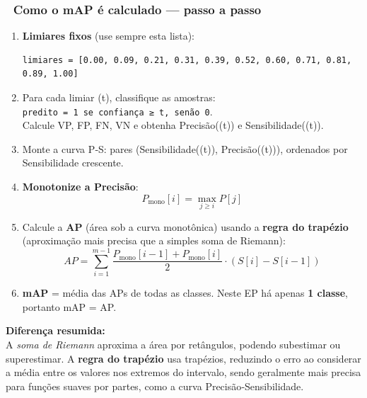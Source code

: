 \documentclass[
  portuguese,
  letterpaper,
  openany,
  oneside,
  12pt,
  a4paper]{book}
\begin{document}
\subsubsection{🔢 Como o mAP é calculado --- passo a
passo}\label{como-o-map-uxe9-calculado-passo-a-passo}

\begin{enumerate}
\def\labelenumi{\arabic{enumi}.}
\item
  \textbf{Limiares fixos} (use sempre esta lista):

\begin{verbatim}
limiares = [0.00, 0.09, 0.21, 0.31, 0.39, 0.52, 0.60, 0.71, 0.81, 0.89, 1.00]
\end{verbatim}
\item
  Para cada limiar (t), classifique as amostras:
  \texttt{predito\ =\ 1\ se\ confiança\ ≥\ t,\ senão\ 0}.\\
  Calcule VP, FP, FN, VN e obtenha Precisão((t)) e Sensibilidade((t)).
\item
  Monte a curva P‑S: pares (Sensibilidade((t)), Precisão((t))),
  ordenados por Sensibilidade crescente.
\item
  \textbf{Monotonize a Precisão}:\\
  \[P_{\text{mono}}[i] = \max_{j \ge i} P[j]\]
\item
  Calcule a \textbf{AP} (área sob a curva monotônica) usando a
  \textbf{regra do trapézio} (aproximação mais precisa que a simples
  soma de Riemann):\\
  \[AP = \sum_{i=1}^{m-1} \frac{P_{\text{mono}}[i-1] + P_{\text{mono}}[i]}{2} \cdot (S[i] - S[i-1])\]
\item
  \textbf{mAP} = média das APs de todas as classes. Neste EP há apenas
  \textbf{1 classe}, portanto mAP = AP.
\end{enumerate}

\begin{tcolorbox}[enhanced jigsaw, coltitle=black, colback=white, colbacktitle=quarto-callout-note-color!10!white, bottomtitle=1mm, left=2mm, opacityback=0, breakable, rightrule=.15mm, titlerule=0mm, toptitle=1mm, opacitybacktitle=0.6, title=\textcolor{quarto-callout-note-color}{\faInfo}\hspace{0.5em}{Nota}, colframe=quarto-callout-note-color-frame, arc=.35mm, bottomrule=.15mm, toprule=.15mm, leftrule=.75mm]

\textbf{ Diferença resumida:}\\
A \emph{soma de Riemann} aproxima a área por retângulos, podendo
subestimar ou superestimar. A \textbf{regra do trapézio} usa trapézios,
reduzindo o erro ao considerar a média entre os valores nos extremos do
intervalo, sendo geralmente mais precisa para funções suaves por partes,
como a curva Precisão‑Sensibilidade.

\end{tcolorbox}
\end{document}
